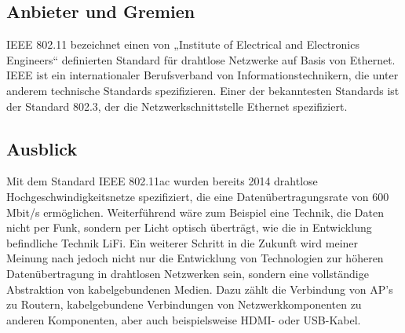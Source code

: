 \begin{multicols}{3}


\subsection*{Anbieter und Gremien}
IEEE 802.11 bezeichnet einen von „Institute of Electrical and Electronics Engineers“ definierten Standard für drahtlose Netzwerke auf Basis von Ethernet. IEEE ist ein internationaler Berufsverband von Informationstechnikern, die unter anderem technische Standards spezifizieren. Einer der bekanntesten Standards ist der Standard 802.3, der die Netzwerkschnittstelle Ethernet spezifiziert.

\subsection*{Ausblick}
Mit dem Standard IEEE 802.11ac wurden bereits 2014 drahtlose Hochgeschwindigkeitsnetze spezifiziert, die eine Datenübertragungsrate von 600 Mbit/s ermöglichen. Weiterführend wäre zum Beispiel eine Technik, die Daten nicht per Funk, sondern per Licht optisch überträgt, wie die in Entwicklung befindliche Technik LiFi.
Ein weiterer Schritt in die Zukunft wird meiner Meinung nach jedoch nicht nur die Entwicklung von Technologien zur höheren Datenübertragung in drahtlosen Netzwerken sein, sondern eine vollständige Abstraktion von kabelgebundenen Medien. Dazu zählt die Verbindung von AP's zu Routern, kabelgebundene Verbindungen von Netzwerkkomponenten zu anderen Komponenten, aber auch beispielsweise HDMI- oder USB-Kabel.

\printbibliography[segment=1,heading=subbibliography]

\end{multicols}
\newpage